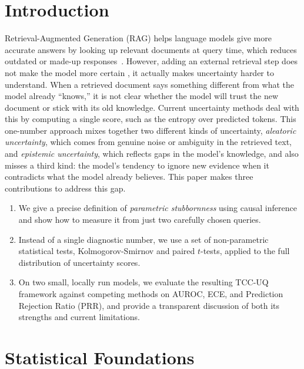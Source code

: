 \documentclass[twoside]{article}
\begin{document}
\section{Introduction}

Retrieval-Augmented Generation (RAG) helps language models give more
accurate answers by looking up relevant documents at query time, which
reduces outdated or made-up responses~\cite{lewis2020retrieval}. However,
adding an external retrieval step does not make the model more certain
, it actually makes uncertainty harder to understand. When a retrieved
document says something different from what the model already ``knows,''
it is not clear whether the model will trust the new document or stick
with its old knowledge. Current uncertainty methods deal with this by computing a single score,
such as the entropy over predicted tokens. This one-number approach
mixes together two different kinds of uncertainty, \emph{aleatoric
uncertainty}, which comes from genuine noise or ambiguity in the
retrieved text, and \emph{epistemic uncertainty}, which reflects gaps
in the model's knowledge, and also misses a third kind: the model's
tendency to ignore new evidence when it contradicts what the model
already believes. This paper makes three contributions to address this gap.
\begin{enumerate}
  \item We give a precise definition of \emph{parametric stubbornness}
    using causal inference and show how to measure it from just two
    carefully chosen queries.
  \item Instead of a single diagnostic number, we use a set of
    non-parametric statistical tests, Kolmogorov-Smirnov and paired
    $t$-tests, applied to the full distribution of uncertainty scores.
  \item On two small, locally run models, we evaluate the resulting
    TCC-UQ framework against competing methods on AUROC, ECE, and
    Prediction Rejection Ratio (PRR), and provide a transparent
    discussion of both its strengths and current limitations.
\end{enumerate}

\section{Statistical Foundations}
\end{document}

